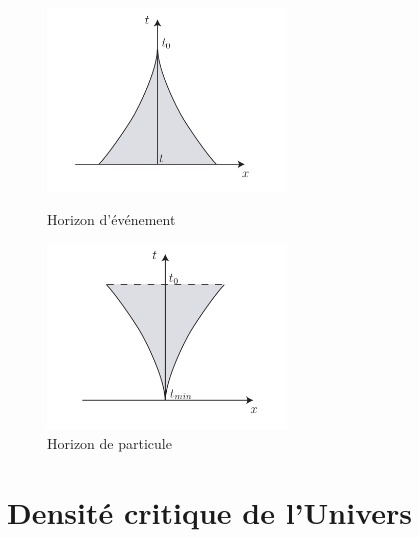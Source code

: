 \documentclass[a4paper,12pt]{report}
\theoremstyle{plain}
\theoremstyle{plain}
\begin{document}
\begin{figure}[h]
\begin{minipage}{14pc}
\includegraphics[width=15pc]{t6.png}
\caption{Horizon d'\'ev\'enement}
\end{minipage}\hspace{3pc}%
\begin{minipage}{14pc}
\includegraphics[width=15pc]{t8.png}
\caption{Horizon de particule}
\end{minipage}\hspace{3pc}%
\end{figure}

\section{Densit\'e critique de l'Univers} 
\end{document}
